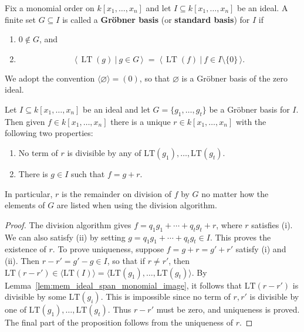 \begin{definition}\label{def:Groebner_basis} %
  \leanok 
  Fix a monomial order on $k[x_1,\dots,x_n]$ and let $I \subseteq k[x_1,\dots,x_n]$ be an ideal.
  A finite set $G \subseteq I$ is called a \textbf{Gr\"obner basis} (or \textbf{standard basis}) for $I$ if
  \begin{enumerate}
    \item $0 \notin G$, and
    \item
    \[
      \big\langle\, \operatorname{LT}(g)\ \big|\ g\in G \,\big\rangle
      \;=\;
      \big\langle\, \operatorname{LT}(f)\ \big|\ f\in I\setminus\{0\} \,\big\rangle .
    \]
  \end{enumerate}
  We adopt the convention $\langle \varnothing\rangle = (0)$, so that $\varnothing$ is a Gr\"obner basis of the zero ideal.
\end{definition}

\begin{proposition}\label{prop:GR_Unique_Remainder} %
  \leanok 
  Let $I \subseteq k[x_1,\dots,x_n]$ be an ideal and let $G = \{g_1,\dots,g_t\}$ be a Gr{\"o}bner basis for $I$.  
  Then given $f \in k[x_1,\dots,x_n]$ there is a unique $r \in k[x_1,\dots,x_n]$ with the following two properties:
  \begin{enumerate}
  \item No term of $r$ is divisible by any of 
    \(\mathrm{LT}(g_1),\dots,\mathrm{LT}(g_t)\).
  \item There is $g\in I$ such that $f = g + r$.
  \end{enumerate}
  In particular, $r$ is the remainder on division of $f$ by $G$ no matter how the elements of $G$ are listed when using the division algorithm.
\end{proposition}
\begin{proof}
  \leanok
  The division algorithm gives $f = q_1 g_1 + \cdots + q_t g_t + r$, where $r$ satisfies (i). We can also satisfy (ii) by setting $g = q_1 g_1 + \cdots + q_t g_t \in I$. 
  This proves the existence of $r$.
  To prove uniqueness, suppose $f = g+r = g'+r'$ satisfy (i) and (ii). 
  Then $r-r' = g' - g \in I$, so that if $r \ne r'$, then $\text{LT}(r-r') \in \langle \text{LT}(I) \rangle = \langle \text{LT}(g_1), \dots, \text{LT}(g_t) \rangle$. 
  By Lemma~\ref{lem:mem_ideal_span_monomial_image}, it follows that $\text{LT}(r-r')$ is divisible by some $\text{LT}(g_i)$. 
  This is impossible since no term of $r, r'$ is divisible by one of $\text{LT}(g_1), \dots, \text{LT}(g_t)$. Thus $r-r'$ must be zero, and uniqueness is proved.
  The final part of the proposition follows from the uniqueness of $r$.
\end{proof}

